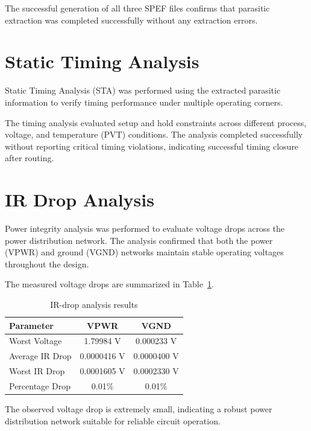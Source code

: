 The successful generation of all three SPEF files confirms that parasitic extraction was completed successfully without any extraction errors.


\section{Static Timing Analysis}

Static Timing Analysis (STA) was performed using the extracted parasitic information to verify timing performance under multiple operating corners.

The timing analysis evaluated setup and hold constraints across different process, voltage, and temperature (PVT) conditions. The analysis completed successfully without reporting critical timing violations, indicating successful timing closure after routing.


\section{IR Drop Analysis}

Power integrity analysis was performed to evaluate voltage drops across the power distribution network. The analysis confirmed that both the power (VPWR) and ground (VGND) networks maintain stable operating voltages throughout the design.

The measured voltage drops are summarized in Table~\ref{tab:irdrop_results}.

\begin{table}[!htbp]
\centering
\caption{IR-drop analysis results}
\label{tab:irdrop_results}
\begin{tabular}{lcc}
\toprule
Parameter & VPWR & VGND\\
\midrule
Worst Voltage & 1.79984 V & 0.000233 V\\
Average IR Drop & 0.0000416 V & 0.0000400 V\\
Worst IR Drop & 0.0001605 V & 0.0002330 V\\
Percentage Drop & 0.01\% & 0.01\%\\
\bottomrule
\end{tabular}
\end{table}

The observed voltage drop is extremely small, indicating a robust power distribution network suitable for reliable circuit operation.

